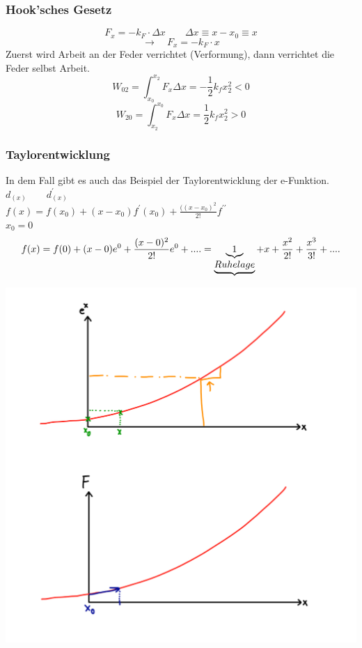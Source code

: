\documentclass[11pt]{article}
\begin{document}
			\subsubsection{Hook'sches Gesetz}
			$$F_x=-k_F\cdot\Delta x\quad\quad\Delta x\equiv x-x_0\equiv x$$
			$$\rightarrow\quad F_x=-k_F\cdot x$$
			Zuerst wird Arbeit an der Feder verrichtet (Verformung), dann verrichtet die Feder selbst Arbeit.
			$$W_{02}=\int_{x_0}^{x_2}F_x\Delta x=-\frac{1}{2}k_fx_2^2<0$$
			$$W_{20}=\int_{x_2}^{x_0}F_x\Delta x=\frac{1}{2}k_fx_2^2>0$$
			\subsubsection{Taylorentwicklung}
			In dem Fall gibt es auch das Beispiel der Taylorentwicklung der e-Funktion.
			$d_{(x)} \qquad d^\prime_{(x)}$\\
			$f(x) = f(x_0) + (x - x_0) f^\prime(x_0) + \frac{((x -x_0)^2}{2!} f^{\prime\prime}$\\
			$x_0 = 0$
			\[ f(x) = f(0) + (x-0) e^0 + \frac{(x-0)^2}{2!}e^0 + .... \\
			= \underbrace{1}_{\underbrace{Ruhelage}} + x + \frac{x^2}{2!} + \frac{x^3}{3!}+ .... \]
			\begin{center}
				\includegraphics[scale=0.2]{IMG_94B96AE1BBE0-1.jpeg}
			\end{center}
\end{document}
